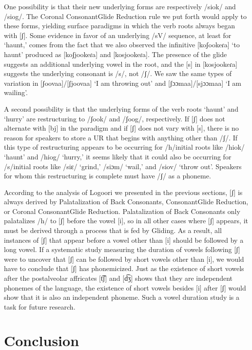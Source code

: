 \documentclass[output=paper]{langsci/langscibook}
\begin{document}
One possibility is that their new underlying forms are respectively /siok/ and /siog/. The Coronal ConsonantGlide Reduction rule we put forth would apply to these forms, yielding surface paradigms in which the verb roots always began with [ʃ]. Some evidence in favor of an underlying /sV/ sequence, at least for ‘haunt,’ comes from the fact that we also observed the infinitive [koʃookeɾa] ‘to haunt’ produced as [koʃjookeɾa] and [kosjookeɾa]. The presence of the glide suggests an additional underlying vowel in the root, and the [s] in [kosjookeɾa] suggests the underlying consonant is /s/, not /ʃ/. We saw the same types of variation in [ʃoovaa]/[ʃjoovaa] ‘I am throwing out’ and [ʃɔɔmaa]/[sjɔɔmaa] ‘I am wailing’. 

A second possibility is that the underlying forms of the verb roots ‘haunt’ and ‘hurry’ are restructuring to /ʃook/ and /ʃoog/, respectively. If [ʃ] does not alternate with [bj] in the paradigm and if [ʃ] does not vary with [s], there is no reason for speakers to store a UR that begins with anything other than /ʃ/. If this type of restructuring appears to be occurring for /h/initial roots like /hiok/ ‘haunt’ and /hiog/ ‘hurry,’ it seems likely that it could also be occurring for /s/initial roots like /siɛ/ ‘grind,’ /siɔm/ ‘wail,’ and /siov/ ‘throw out’. Speakers for whom this restructuring is complete must have /ʃ/ as a phoneme. 

According to the analysis of Logoori we presented in the previous sections, [ʃ] is always derived by Palatalization of Back Consonants, ConsonantGlide Reduction, or Coronal ConsonantGlide Reduction. Palatalization of Back Consonants only palatalizes /h/ to [ʃ] before the vowel [i], so in all other cases where [ʃ] appears, it must be derived through a process that is fed by Gliding. As a result, all instances of [ʃ] that appear before a vowel other than [i] should be followed by a long vowel. If a systematic study measuring the duration of vowels following [ʃ] were to uncover that [ʃ] can be followed by short vowels other than [i], we would have to conclude that [ʃ] has phonemicized. Just as the existence of short vowels after the postalveolar affricates [t͡ʃ] and [d͡ʒ] shows that they are independent phonemes of the language, the existence of short vowels besides [i] after [ʃ] would show that it is also an independent phoneme. Such a vowel duration study is a task for future research.

\section{Conclusion}
\end{document}
